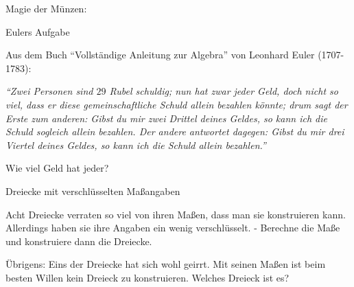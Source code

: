 \documentclass[a4paper, twoside, parskip, 10pt, smallheadings]{scrbook}
\theoremstyle{plain}
\theoremstyle{definition}
\begin{document}
\item Magie der Münzen:

\begin{center}
\end{center} 



\item Eulers Aufgabe

Aus dem Buch "`Vollständige Anleitung zur Algebra"' von Leonhard Euler (1707-1783):

{\it "`Zwei Personen sind $29$ Rubel schuldig; nun hat zwar jeder Geld, doch nicht so viel, dass er diese gemeinschaftliche Schuld allein bezahlen könnte; drum sagt der Erste zum anderen: Gibst du mir zwei Drittel deines Geldes, so kann ich die Schuld sogleich allein bezahlen. Der andere antwortet dagegen: Gibst du mir drei Viertel deines Geldes, so kann ich die Schuld allein bezahlen."'}

Wie viel Geld hat jeder?






\item Dreiecke mit verschlüsselten Maßangaben

Acht Dreiecke verraten so viel von ihren Maßen, dass man sie konstruieren kann. Allerdings haben sie ihre Angaben ein wenig verschlüsselt. - Berechne die Maße und konstruiere dann die Dreiecke.

Übrigens: Eins der Dreiecke hat sich wohl geirrt. Mit seinen Maßen ist beim besten Willen kein Dreieck zu konstruieren. Welches Dreieck ist es?
\end{document}
